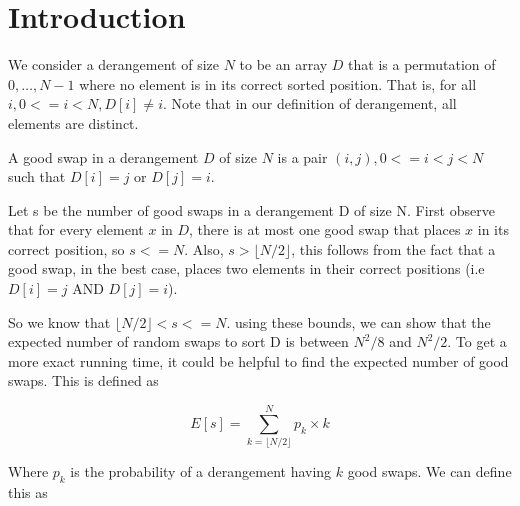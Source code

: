 \documentclass[12pt]{article}
\begin{document}
\maketitle


\section{Introduction}

We consider a derangement of size $N$ to be an array $D$ that is a permutation of ${0, …, N - 1}$
where no element is in its correct sorted position.
That is, for all $i, 0 <= i < N, D[i] \neq i$. Note that in our definition of derangement,
all elements are distinct.


A good swap in a derangement $D$ of size $N$ is a pair $(i, j), 0 <= i < j < N$
such that $D[i] = j$ or $D[j] = i$.

Let s be the number of good swaps in a derangement D of size N.
First observe that for every element $x$ in $D$, there is at most one good swap that places $x$ in its
correct position, so $s <= N$. Also, $s > \lfloor N / 2 \rfloor$, this follows from the fact that a good swap,
 in the best case, places two elements in their correct positions (i.e $D[i] = j$ AND $D[j] = i$).

So we know that $ \lfloor N/2 \rfloor < s <= N$. using these bounds, we can show that the expected number of random
swaps to sort D is between $N^2/8$ and $N^2/2$. To get a more exact running time, it could be
helpful to find the expected number of good swaps. This is defined as

\[ E[s] = \sum_{k = \lfloor N/2 \rfloor}^{N} p_k \times k \]

Where $p_k$ is the probability of a derangement having $k$ good swaps. We can define this as
\end{document}

